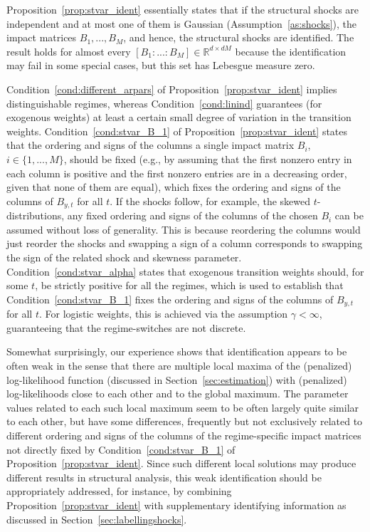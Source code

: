 \documentclass[nojss]{jss}
\begin{document}
Proposition~\ref{prop:stvar_ident} essentially states that if the structural shocks are independent and at most one of them is Gaussian (Assumption~\ref{as:shocks}), the impact matrices $B_1,...,B_M$, and hence, the structural shocks are identified. The result holds for almost every $[B_1:...:B_M] \in\mathbb{R}^{d\times dM}$ because the identification may fail in some special cases, but this set has Lebesgue measure zero.

Condition~\ref{cond:different_arpars} of Proposition~\ref{prop:stvar_ident} implies distinguishable regimes, whereas Condition~\ref{cond:linind} guarantees (for exogenous weights) at least a certain small degree of variation in the transition weights. Condition~\ref{cond:stvar_B_1} of Proposition~\ref{prop:stvar_ident} states that the ordering and signs of the columns a single impact matrix $B_i$, $i\in\{1,...,M\}$, should be fixed (e.g., by assuming that the first nonzero entry in each column is positive and the first nonzero entries are in a decreasing order, given that none of them are equal), which fixes the ordering and signs of the columns of $B_{y,t}$ for all $t$. If the shocks follow, for example, the skewed $t$-distributions, any fixed ordering and signs of the columns of the chosen $B_i$ can be assumed without loss of generality. This is because reordering the columns would just reorder the shocks and swapping a sign of a column corresponds to swapping the sign of the related shock and skewness parameter. Condition~\ref{cond:stvar_alpha} states that exogenous transition weights should, for some $t$, be strictly positive for all the regimes, which is used to establish that Condition~\ref{cond:stvar_B_1} fixes the ordering and signs of the columns of $B_{y,t}$ for all $t$. For logistic weights, this is achieved via the assumption $\gamma<\infty$, guaranteeing that the regime-switches are not discrete.

Somewhat surprisingly, our experience shows that identification appears to be often weak in the sense that there are multiple local maxima of the (penalized) log-likelihood function (discussed in Section~\ref{sec:estimation}) with (penalized) log-likelihoods close to each other and to the global maximum. The parameter values related to each such local maximum seem to be often largely quite similar to each other, but have some differences, frequently but not exclusively related to different ordering and signs of the columns of the regime-specific impact matrices not directly fixed by Condition~\ref{cond:stvar_B_1} of Proposition~\ref{prop:stvar_ident}. Since such different local solutions may produce different results in structural analysis, this weak identification should be appropriately addressed, for instance, by combining Proposition~\ref{prop:stvar_ident} with supplementary identifying information as discussed in Section~\ref{sec:labellingshocks}.
\end{document}
